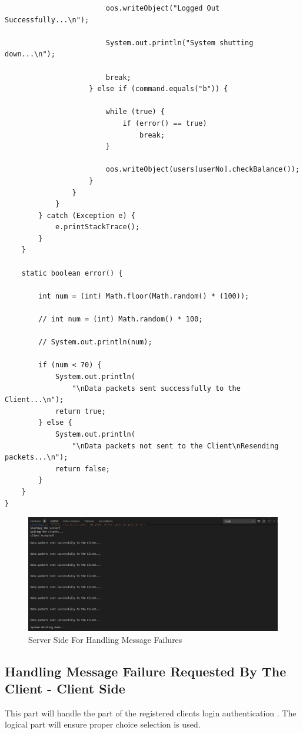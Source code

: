 \documentclass[11pt]{article}
\begin{document}
\begin{verbatim}
                        oos.writeObject("Logged Out Successfully...\n");

                        System.out.println("System shutting down...\n");

                        break;
                    } else if (command.equals("b")) {

                        while (true) {
                            if (error() == true)
                                break;
                        }

                        oos.writeObject(users[userNo].checkBalance());
                    }
                }
            }
        } catch (Exception e) {
            e.printStackTrace();
        }
    }

    static boolean error() {

        int num = (int) Math.floor(Math.random() * (100));

        // int num = (int) Math.random() * 100;

        // System.out.println(num);

        if (num < 70) {
            System.out.println(
                "\nData packets sent successfully to the Client...\n");
            return true;
        } else {
            System.out.println(
                "\nData packets not sent to the Client\nResending packets...\n");
            return false;
        }
    }
}
\end{verbatim}
\begin{figure}[!h]
\centering
\includegraphics[width=\textwidth]{message_server.png}
\caption{Server Side For Handling Message Failures}
\end{figure}


\subsection{Handling Message Failure Requested By The Client - Client Side}
This part will handle the part of the registered clients login authentication . The logical part will ensure proper choice selection is used.
\end{document}
